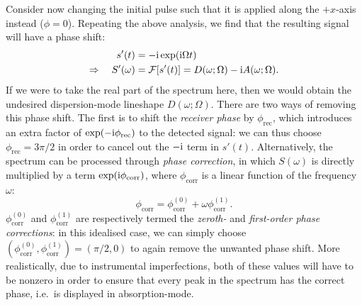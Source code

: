 Consider now changing the initial pulse such that it is applied along the $+x$-axis instead ($\phi = 0$).
Repeating the above analysis, we find that the resulting signal will have a phase shift:
\begin{align}
    \label{eq:fid_phase_shifted}
    s'(t) &= -\mathrm{i}\exp(\mathrm{i}\Omega t) \\
    \Rightarrow \quad S'(\omega) &= \mathcal{F}[s'(t)] = D(\omega;\Omega) - \mathrm{i} A(\omega;\Omega).
\end{align}
If we were to take the real part of the spectrum here, then we would obtain the undesired dispersion-mode lineshape $D(\omega;\Omega)$.
There are two ways of removing this phase shift.
The first is to shift the \textit{receiver phase} by $\phi_\text{rec}$, which introduces an extra factor of $\exp(-\mathrm{i}\phi_\text{rec})$ to the detected signal: we can thus choose $\phi_\text{rec} = 3\pi/2$ in order to cancel out the $-\mathrm{i}$ term in $s'(t)$.
Alternatively, the spectrum can be processed through \textit{phase correction}, in which $S(\omega)$ is directly multiplied by a term $\exp(\mathrm{i}\phi_\text{corr})$, where $\phi_\text{corr}$ is a linear function of the frequency $\omega$:
\begin{equation}
    \label{eq:phase_correction}
    \phi_\text{corr} = \phi_{\text{corr}}^{(0)} + \omega\phi_{\text{corr}}^{(1)}.
\end{equation}
$\phi_\text{corr}^{(0)}$ and $\phi_\text{corr}^{(1)}$ are respectively termed the \textit{zeroth-} and \textit{first-order phase corrections}: in this idealised case, we can simply choose $(\phi_\text{corr}^{(0)}, \phi_\text{corr}^{(1)}) = (\pi/2, 0)$ to again remove the unwanted phase shift.
More realistically, due to instrumental imperfections, both of these values will have to be nonzero in order to ensure that every peak in the spectrum has the correct phase, i.e.\ is displayed in absorption-mode.

